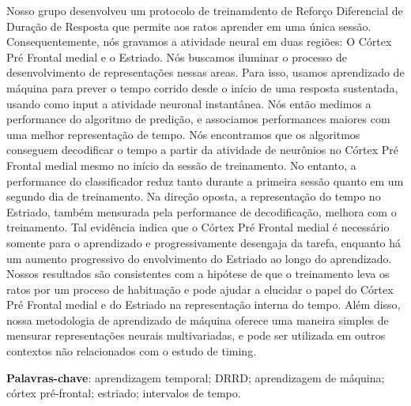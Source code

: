 Nosso grupo desenvolveu um protocolo de treinamdento de Reforço Diferencial de Duração de Resposta que permite aos ratos aprender em uma única sessão. Consequentemente, nós gravamos a atividade neural em duas regiões: O Córtex Pré Frontal medial e o Estriado. Nós buscamos iluminar o processo de desenvolvimento de representações nessas areas. Para isso, usamos aprendizado de máquina para prever o tempo corrido desde o início de uma resposta sustentada, usando como input a atividade neuronal instantânea. Nós então medimos a performance do algoritmo de predição, e associamos performances maiores com uma melhor representação de tempo. Nós encontramos que os algoritmos conseguem decodificar o tempo a partir da atividade de neurônios no Córtex Pré Frontal medial mesmo no início da sessão de treinamento. No entanto, a performance do classificador reduz tanto durante a primeira sessão quanto em um segundo dia de treinamento. Na direção oposta, a representação do tempo no Estriado, também mensurada pela performance de decodificação, melhora com o treinamento. Tal evidência indica que o Córtex Pré Frontal medial é necessário somente para o aprendizado e progressivamente desengaja da tarefa, enquanto há um aumento progressivo do envolvimento do Estriado ao longo do aprendizado. Nossos resultados são consistentes com a hipótese de que o treinamento leva os ratos por um proceso de habituação e pode ajudar a elucidar o papel do Córtex Pré Frontal medial e do Estriado na representação interna do tempo. Além disso, nossa metodologia de aprendizado de máquina oferece uma maneira simples de mensurar representações neurais multivariadas, e pode ser utilizada em outros contextos não relacionados com o estudo de timing.

\textbf{Palavras-chave}: aprendizagem temporal; DRRD; aprendizagem de máquina; córtex pré-frontal; estriado; intervalos de tempo.